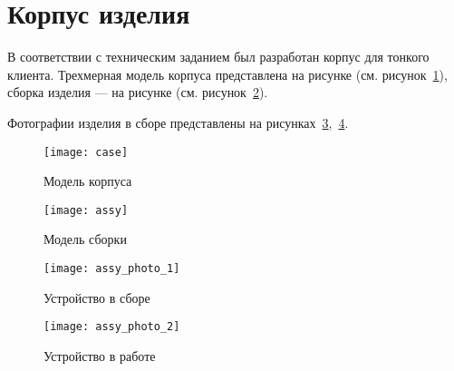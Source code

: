 \section{Корпус изделия}
В соответствии с техническим заданием был разработан корпус для тонкого клиента.
Трехмерная модель корпуса представлена на рисунке (см. рисунок~\ref{pic:case}), сборка
изделия — на рисунке (см. рисунок~\ref{pic:assy}).

Фотографии изделия в сборе представлены на
рисунках~\ref{pic:assy_photo_1},~\ref{pic:assy_photo_2}.

\begin{figure}[h]
    \center
    \texttt{[image: case]}
    \caption{Модель корпуса}
    \label{pic:case}
\end{figure}

\begin{figure}[h]
    \center
    \texttt{[image: assy]}
    \caption{Модель сборки}
    \label{pic:assy}
\end{figure}

\begin{figure}[h]
    \center
    \texttt{[image: assy\_photo\_1]}
    \caption{Устройство в сборе}
    \label{pic:assy_photo_1}
\end{figure}

\begin{figure}[h]
    \center
    \texttt{[image: assy\_photo\_2]}
    \caption{Устройство в работе}
    \label{pic:assy_photo_2}
\end{figure}
